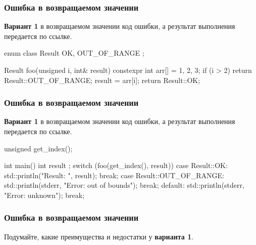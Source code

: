 \documentclass[compress, 8pt, aspectratio=169]{beamer}
\begin{document}
  \begin{frame}[fragile]

    \frametitle{Ошибка в возвращаемом значении}

    \textbf{Вариант 1} \textemdash \space в возвращаемом значении код ошибки,
    а результат выполнения передается по ссылке.

    \begin{myinplacelisting}[minted language=cpp]
enum class Result {
    OK,
    OUT_OF_RANGE
};

Result foo(unsigned i, int& result) {
    constexpr int arr[] = {1, 2, 3};
    if (i > 2) {
        return Result::OUT_OF_RANGE;
    }
    result = arr[i];
    return Result::OK;
}
    \end{myinplacelisting}

  \end{frame}

  \begin{frame}[fragile]

    \frametitle{Ошибка в возвращаемом значении}

    \textbf{Вариант 1} \textemdash \space в возвращаемом значении код ошибки,
    а результат выполнения передается по ссылке.

    \begin{myinplacelisting}[minted language=cpp]
unsigned get_index();

int main() {
    int result {};
    switch (foo(get_index(), result)) {
        case Result::OK:
            std::println("Result: {}", result);
            break;
        case Result::OUT_OF_RANGE:
            std::println(stderr, "Error: out of bounds");
            break;
        default:
            std::println(stderr, "Error: unknown");
            break;
    }
}
    \end{myinplacelisting}

  \end{frame}

  \begin{frame}[fragile]

    \frametitle{Ошибка в возвращаемом значении}

    \begin{task}
      Подумайте, какие преимущества и недостатки у \textbf{варианта 1}.
    \end{task}

  \end{frame}
\end{document}
